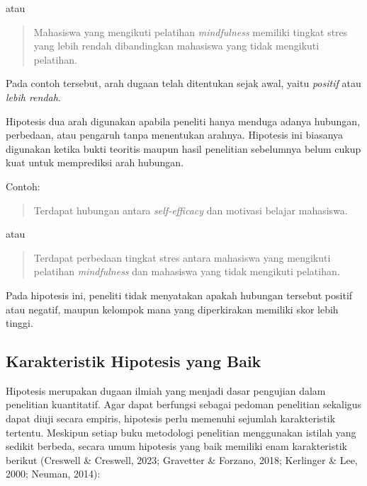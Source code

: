 \documentclass[
  indonesian,
  letterpaper,
  DIV=11,
  numbers=noendperiod]{scrreprt}
\begin{document}
\begin{enumerate}
  atau

  \begin{quote}
  Mahasiswa yang mengikuti pelatihan \emph{mindfulness} memiliki tingkat
  stres yang lebih rendah dibandingkan mahasiswa yang tidak mengikuti
  pelatihan.
  \end{quote}

  Pada contoh tersebut, arah dugaan telah ditentukan sejak awal, yaitu
  \emph{positif} atau \emph{lebih rendah}.

  Hipotesis dua arah digunakan apabila peneliti hanya menduga adanya
  hubungan, perbedaan, atau pengaruh tanpa menentukan arahnya. Hipotesis
  ini biasanya digunakan ketika bukti teoritis maupun hasil penelitian
  sebelumnya belum cukup kuat untuk memprediksi arah hubungan.

  Contoh:

  \begin{quote}
  Terdapat hubungan antara \emph{self-efficacy} dan motivasi belajar
  mahasiswa.
  \end{quote}

  atau

  \begin{quote}
  Terdapat perbedaan tingkat stres antara mahasiswa yang mengikuti
  pelatihan \emph{mindfulness} dan mahasiswa yang tidak mengikuti
  pelatihan.
  \end{quote}

  Pada hipotesis ini, peneliti tidak menyatakan apakah hubungan tersebut
  positif atau negatif, maupun kelompok mana yang diperkirakan memiliki
  skor lebih tinggi.
\end{enumerate}

\subsection{Karakteristik Hipotesis yang
Baik}\label{karakteristik-hipotesis-yang-baik}

Hipotesis merupakan dugaan ilmiah yang menjadi dasar pengujian dalam
penelitian kuantitatif. Agar dapat berfungsi sebagai pedoman penelitian
sekaligus dapat diuji secara empiris, hipotesis perlu memenuhi sejumlah
karakteristik tertentu. Meskipun setiap buku metodologi penelitian
menggunakan istilah yang sedikit berbeda, secara umum hipotesis yang
baik memiliki enam karakteristik berikut (Creswell \& Creswell, 2023;
Gravetter \& Forzano, 2018; Kerlinger \& Lee, 2000; Neuman, 2014):
\end{document}
